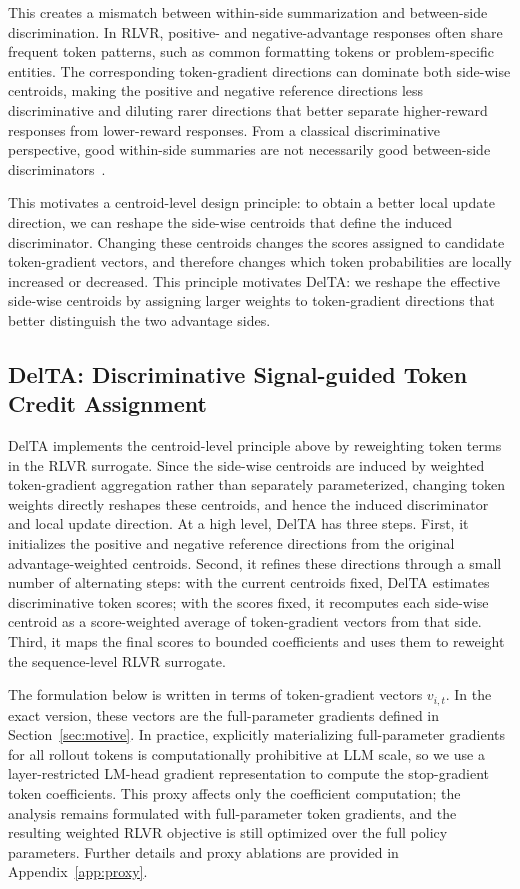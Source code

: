 \documentclass{llmxive}
\begin{document}
This creates a mismatch between within-side summarization and between-side discrimination. 
In RLVR, positive- and negative-advantage responses often share frequent token patterns, such as common formatting tokens or problem-specific entities. 
The corresponding token-gradient directions can dominate both side-wise centroids, making the positive and negative reference directions less discriminative and diluting rarer directions that better separate higher-reward responses from lower-reward responses. 
From a classical discriminative perspective, good within-side summaries are not necessarily good between-side discriminators~\citep{cohen2013applied,zhao2024linear,khosla2020supervised}.

This motivates a centroid-level design principle: to obtain a better local update direction, we can reshape the side-wise centroids that define the induced discriminator. 
Changing these centroids changes the scores assigned to candidate token-gradient vectors, and therefore changes which token probabilities are locally increased or decreased. 
This principle motivates DelTA: we reshape the effective side-wise centroids by assigning larger weights to token-gradient directions that better distinguish the two advantage sides.

\subsection{DelTA: Discriminative Signal-guided Token Credit Assignment}
\label{sec:DelTA}

DelTA implements the centroid-level principle above by reweighting token terms in the RLVR surrogate. 
Since the side-wise centroids are induced by weighted token-gradient aggregation rather than separately parameterized, changing token weights directly reshapes these centroids, and hence the induced discriminator and local update direction. 
At a high level, DelTA has three steps. 
First, it initializes the positive and negative reference directions from the original advantage-weighted centroids. 
Second, it refines these directions through a small number of alternating steps: with the current centroids fixed, DelTA estimates discriminative token scores; with the scores fixed, it recomputes each side-wise centroid as a score-weighted average of token-gradient vectors from that side. 
Third, it maps the final scores to bounded coefficients and uses them to reweight the sequence-level RLVR surrogate.

The formulation below is written in terms of token-gradient vectors \(v_{i,t}\). 
In the exact version, these vectors are the full-parameter gradients defined in Section~\ref{sec:motive}. 
In practice, explicitly materializing full-parameter gradients for all rollout tokens is computationally prohibitive at LLM scale, so we use a layer-restricted LM-head gradient representation to compute the stop-gradient token coefficients. 
This proxy affects only the coefficient computation; the analysis remains formulated with full-parameter token gradients, and the resulting weighted RLVR objective is still optimized over the full policy parameters. 
Further details and proxy ablations are provided in Appendix~\ref{app:proxy}.
\end{document}
